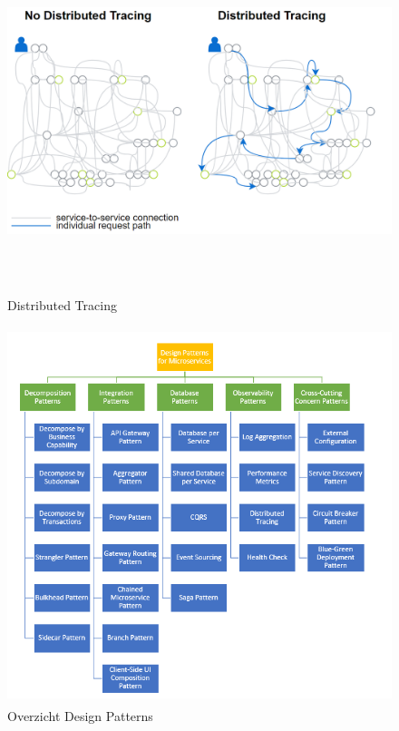 \begin{figure}[!htb]
    \centering
    \includegraphics[height=10cm]{DistributedTracing.png}
    \caption{Distributed Tracing \label{distributed}}
\end{figure}
\begin{figure}[!htb]
    \centering
    \includegraphics[height=11cm]{DesignPatterns.png}
    \caption{Overzicht Design Patterns \label{overzicht}}
\end{figure}
\newpage
